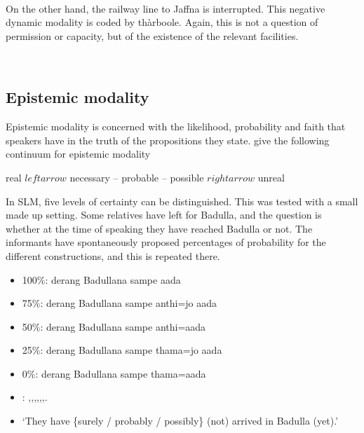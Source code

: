 

 \\
On the other hand, the railway line to Jaffna is interrupted. This negative dynamic modality is coded by thàrboole. Again, this is not a question of permission or capacity, but of the existence of the relevant facilities.


 \\
%
\subsection{Epistemic modality}\label{sec:func:Epistemicmodality}
Epistemic modality is concerned with the likelihood, probability and faith that speakers have in the truth of the propositions they state.
\citet[213]{FoleyEtAl1984} give the following continuum for epistemic modality

\ea real $leftarrow$ necessary -- probable -- possible $rightarrow$ unreal \z

In SLM, five levels of certainty can be distinguished. This was tested with a small made up setting. Some relatives have left for Badulla, and the question is whether at the time of speaking they have reached Badulla or not. The informants have spontaneously proposed percentages of probability for the different constructions, and this is repeated there.

\begin{itemize}
	\item 100\%: derang Badullana sampe aada
	\item 75\%: derang Badullana sampe anthi=jo aada
	\item 50\%: derang Badullana sampe anthi=aada
	\item 25\%: derang Badullana sampe thama=jo aada
	\item 0\%: derang Badullana sampe thama=aada
	\item: ,,,,,,.
	\item `They have \{surely / probably / possibly\} (not) arrived in Badulla (yet).'
\end{itemize}

